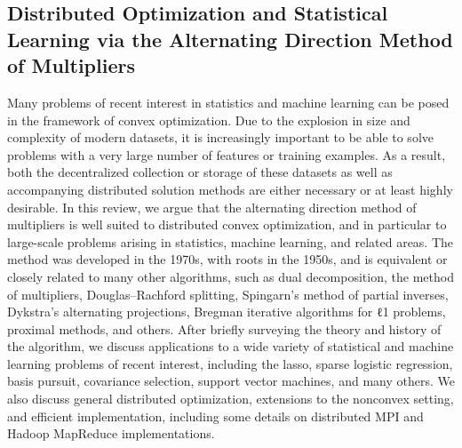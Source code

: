 \documentclass{llncs}
\begin{document}
\subsection{Distributed Optimization and Statistical Learning via the Alternating Direction Method of Multipliers\cite{Boyd:2011:DOS:2185815.2185816}}
Many problems of recent interest in statistics and machine learning can be posed in the framework of convex optimization. Due to the explosion in size and complexity of modern datasets, it is increasingly important to be able to solve problems with a very large number of features or training examples. As a result, both the decentralized collection or storage of these datasets as well as accompanying distributed solution methods are either necessary or at least highly desirable. In this review, we argue that the alternating direction method of multipliers is well suited to distributed convex optimization, and in particular to large-scale problems arising in statistics, machine learning, and related areas. The method was developed in the 1970s, with roots in the 1950s, and is equivalent or closely related to many other algorithms, such as dual decomposition, the method of multipliers, Douglas–Rachford splitting, Spingarn's method of partial inverses, Dykstra's alternating projections, Bregman iterative algorithms for ℓ1 problems, proximal methods, and others. After briefly surveying the theory and history of the algorithm, we discuss applications to a wide variety of statistical and machine learning problems of recent interest, including the lasso, sparse logistic regression, basis pursuit, covariance selection, support vector machines, and many others. We also discuss general distributed optimization, extensions to the nonconvex setting, and efficient implementation, including some details on distributed MPI and Hadoop MapReduce implementations.

%
%



\end{document}
